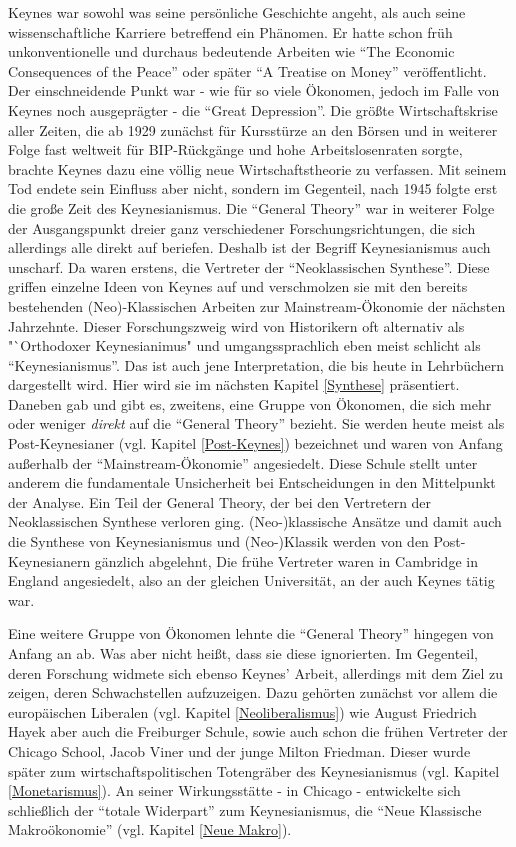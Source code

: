 Keynes war sowohl was seine persönliche Geschichte angeht, als auch seine wissenschaftliche Karriere betreffend ein Phänomen. Er hatte schon früh unkonventionelle und durchaus bedeutende Arbeiten wie \textcite{Keynes1919} "`The Economic Consequences of the Peace"' oder später  \textcite{Keynes1930} "`A Treatise on Money"' veröffentlicht. Der einschneidende Punkt war - wie für so viele Ökonomen, jedoch im Falle von Keynes noch ausgeprägter - die "`Great Depression"'. Die größte Wirtschaftskrise aller Zeiten, die ab 1929 zunächst für Kursstürze an den Börsen und in weiterer Folge fast weltweit für BIP-Rückgänge und hohe Arbeitslosenraten sorgte, brachte Keynes dazu eine völlig neue Wirtschaftstheorie zu verfassen. Mit seinem Tod endete sein Einfluss aber nicht, sondern im Gegenteil, nach 1945 folgte erst die große Zeit des Keynesianismus. Die "`General Theory"' war in weiterer Folge der Ausgangspunkt dreier ganz verschiedener Forschungsrichtungen, die sich allerdings alle direkt auf \textcite{Keynes1936} beriefen. Deshalb ist der Begriff Keynesianismus auch unscharf. Da waren erstens, die Vertreter der "`Neoklassischen Synthese"'. Diese griffen einzelne Ideen von Keynes auf und verschmolzen sie mit den bereits bestehenden (Neo)-Klassischen Arbeiten zur Mainstream-Ökonomie der nächsten Jahrzehnte. Dieser Forschungszweig wird von Historikern oft alternativ als "`Orthodoxer Keynesianimus" und umgangssprachlich eben meist schlicht als "`Keynesianismus"'. Das ist auch jene Interpretation, die bis heute in Lehrbüchern dargestellt wird. Hier wird sie im nächsten Kapitel \ref{Synthese} präsentiert. Daneben gab und gibt es, zweitens, eine Gruppe von Ökonomen, die sich mehr oder weniger \textit{direkt} auf die "`General Theory"' bezieht. Sie werden heute meist als Post-Keynesianer (vgl. Kapitel \ref{Post-Keynes}) bezeichnet und waren von Anfang außerhalb der "`Mainstream-Ökonomie"' angesiedelt. Diese Schule stellt unter anderem die fundamentale Unsicherheit bei Entscheidungen in den Mittelpunkt der Analyse. Ein Teil der General Theory, der bei den Vertretern der Neoklassischen Synthese verloren ging.  (Neo-)klassische Ansätze und damit auch die Synthese von Keynesianismus und (Neo-)Klassik werden von den Post-Keynesianern gänzlich abgelehnt, Die frühe Vertreter waren in Cambridge in England angesiedelt, also an der gleichen Universität, an der auch Keynes tätig war. 

Eine weitere Gruppe von Ökonomen lehnte die "`General Theory"' hingegen von Anfang an ab. Was aber nicht heißt, dass sie diese ignorierten. Im Gegenteil, deren Forschung widmete sich ebenso Keynes' Arbeit, allerdings mit dem Ziel zu zeigen, deren Schwachstellen aufzuzeigen. Dazu gehörten zunächst vor allem die europäischen Liberalen (vgl. Kapitel \ref{Neoliberalismus}) wie August Friedrich Hayek aber auch die Freiburger Schule, sowie auch schon die frühen Vertreter der Chicago School, Jacob Viner und der junge Milton Friedman. Dieser wurde später zum wirtschaftspolitischen Totengräber des Keynesianismus (vgl. Kapitel \ref{Monetarismus}). An seiner Wirkungsstätte - in Chicago - entwickelte sich schließlich der "`totale Widerpart"' zum Keynesianismus, die "`Neue Klassische Makroökonomie"' (vgl. Kapitel \ref{Neue Makro}).

